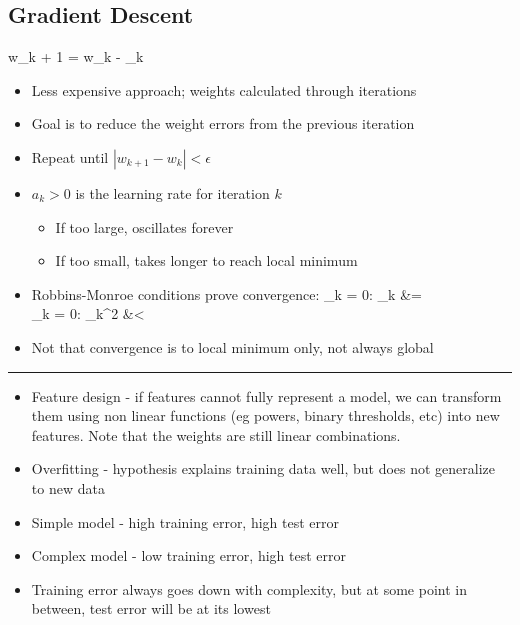 \documentclass[12pt]{article}
\newcommand{\abs}[1]{\left|#1\right|}
\newcommand{\divider}[0]{\par\textcolor{lightgray}{\rule{\textwidth}{0.1pt}}}
\newenvironment{eqn}{\equation\alignedat{3}}{\endalignedat\endequation}
\begin{document}
\subsection{Gradient Descent}

\begin{eqn}
	w_{k + 1} = w_k - \alpha_k 
\end{eqn}
\begin{itemize}
	\item Less expensive approach; weights calculated through iterations
	\item Goal is to reduce the weight errors from the previous iteration
	\item Repeat until $\abs{w_{k + 1} - w_k} < \epsilon$
	\item $a_k > 0$ is the learning rate for iteration $k$
	\begin{itemize}
		\item If too large, oscillates forever
		\item If too small, takes longer to reach local minimum
	\end{itemize}
	\item Robbins-Monroe conditions prove convergence:
	\begin{eqn}
		\Sigma_{k = 0:\infty} \alpha_k &= \infty  \\
		\Sigma_{k = 0:\infty} \alpha_k^2 &< \infty
	\end{eqn}
	\item Not that convergence is to local minimum only, not always global
\end{itemize}

\divider

\begin{itemize}
	\item Feature design - if features cannot fully represent a model, we can transform them using non linear functions (eg powers, binary thresholds, etc) into new features. Note that the weights are still linear combinations.
	\item Overfitting - hypothesis explains training data well, but does not generalize to new data
	\item Simple model - high training error, high test error 
	\item Complex model - low training error, high test error 
	\item Training error always goes down with complexity, but at some point in between, test error will be at its lowest
\end{itemize}
\end{document}
